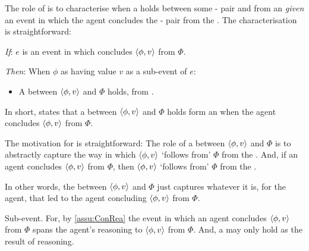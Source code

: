 \begin{note}
  The role of \supportI{} is to characterise when a \ros{} holds between some - pair and \pool{} from an \agpe{} \emph{given} an event in which the agent concludes the - pair from the \pool{}.
  The characterisation is straightforward:

  \begin{idea}[\supportI{}]
    \label{idea:support}
    \vspace{-\baselineskip}
    \begin{itenum}
    \item[\emph{If}:]
      \(e\) is an event in which \vAgent{} concludes \(\langle \phi, v \rangle\) from \(\Phi\).
    \item[\emph{Then}:]
      When \vAgent{}  \(\phi\) as having value \(v\) as a sub-event of \(e\):
      \begin{itemize}
      \item
        A \emph{\ros{}} between \(\langle \phi, v \rangle\) and \(\Phi\) holds, from .
      \end{itemize}
    \end{itenum}
    \vspace{-\baselineskip}
  \end{idea}

  \noindent%
  In short, \supportI{} states that a \ros{} between \(\langle \phi, v \rangle\) and \(\Phi\) holds form an \agpe{} when the agent concludes \(\langle \phi, v \rangle\) from \(\Phi\).

  The motivation for \supportI{} is straightforward:
  The role of  a \ros{} between \(\langle \phi, v \rangle\) and \(\Phi\) is to abstractly capture the way in which \(\langle \phi, v \rangle\) `follows from' \(\Phi\) from the \agpe{}.
  And, if an agent concludes \(\langle \phi, v \rangle\) from \(\Phi\), then \(\langle \phi, v \rangle\) `follows from' \(\Phi\) from the \agpe{}.

  In other words, the \ros{} between \(\langle \phi, v \rangle\) and \(\Phi\) just captures whatever it is, for the agent, that led to the agent concluding \(\langle \phi, v \rangle\) from \(\Phi\).
\end{note}

\begin{note}
  Sub-event.
  For, by \autoref{assu:ConRea} the event in which an agent concludes \(\langle \phi, v \rangle\) from \(\Phi\) spans the agent's reasoning to \(\langle \phi, v \rangle\) from \(\Phi\).
  And, a \ros{} may only hold as the result of reasoning.
\end{note}

